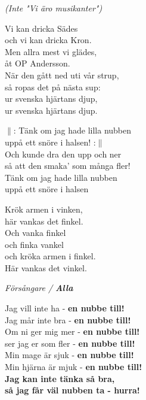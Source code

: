 \documentclass[a6paper,10pt]{article}
\begin{document}
\setlength{\oddsidemargin}{-0.47in}
\noindent
\begin{center}
    \textit{(Inte "Vi äro musikanter")}
\end{center}
Vi kan dricka Sädes \\
och vi kan dricka Kron. \\
Men allra mest vi glädes, \\
åt OP Andersson.
\vspace{5pt}\\
När den gått ned uti vår strup, \\
så ropas det på nästa sup: \\
ur svenska hjärtans djup, \\
ur svenska hjärtans djup. 
\vspace{30pt}
\begin{center}
\end{center}
$\|$: Tänk om jag hade lilla nubben \\
uppå ett snöre i halsen! :$\|$
\vspace{5pt}\\
Och kunde dra den upp och ner \\
så att den smaka' som många fler! \\
Tänk om jag hade lilla nubben \\
uppå ett snöre i halsen 

\newpage
\setlength{\oddsidemargin}{-0.37in}
\noindent
\begin{center}
\end{center}
Krök armen i vinken, \\
här vankas det finkel. \\
Och vanka finkel \\
och finka vankel \\
och kröka armen i finkel. \\
Här vankas det vinkel. 
\begin{center}
    \vspace{40pt}
    \textit{Försångare / \textbf{Alla}}
\end{center}
Jag vill inte ha - \textbf{en nubbe till!}\\
Jag mår inte bra - \textbf{en nubbe till!}\\
Om ni ger mig mer - \textbf{en nubbe till!}\\
ser jag er som fler - \textbf{en nubbe till!}\\
\vspace{5pt}
Min mage är sjuk - \textbf{en nubbe till!}\\
Min hjärna är mjuk - \textbf{en nubbe till!}\\
\textbf{Jag kan inte tänka så bra,\\
så jag får väl nubben ta - hurra!}\\
\end{document}
